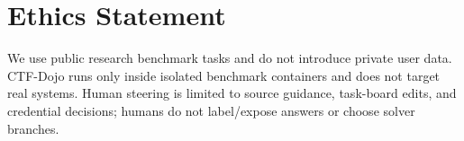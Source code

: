 
\section{Ethics Statement}
\label{sec:ethics}

We use public research benchmark tasks and do not introduce private user data. CTF-Dojo runs only inside isolated benchmark containers and does not target real systems. Human steering is limited to source guidance, task-board edits, and credential decisions; humans do not label/expose answers or choose solver branches.
